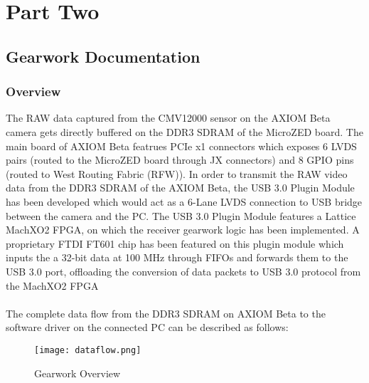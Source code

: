 \documentclass[11pt,oneside,fleqn]{book} %
\begin{document}
\part{Part Two}



\chapter{Gearwork Documentation}
\section{Overview}
The RAW data captured from the CMV12000 sensor on the AXIOM Beta camera gets directly buffered on the DDR3 SDRAM of the MicroZED board. The main board of AXIOM Beta featrues PCIe x1 connectors which exposes 6 LVDS pairs (routed to the MicroZED board through JX connectors) and 8 GPIO pins (routed to West Routing Fabric (RFW)). In order to transmit the RAW video data from the DDR3 SDRAM of the AXIOM Beta, the USB 3.0 Plugin Module has been developed which would act as a 6-Lane LVDS connection to USB bridge between the camera and the PC. The USB 3.0 Plugin Module features a Lattice MachXO2 FPGA, on which the receiver gearwork logic has been implemented. A proprietary FTDI FT601 chip has been featured on this plugin module which inputs the a 32-bit data at 100 MHz through FIFOs and forwards them to  the USB 3.0 port, offloading the conversion of data packets to USB 3.0 protocol from the MachXO2 FPGA
\\ \\ 
The complete data flow from the DDR3 SDRAM on AXIOM Beta to the software driver on the connected PC can be described as follows:

\begin{figure}[h!]
\centering\texttt{[image: dataflow.png]}
\caption{Gearwork Overview}
\end{figure}
\end{document}
